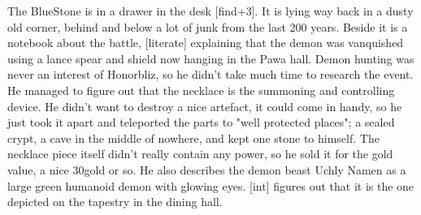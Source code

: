 \documentclass[11pt, twoside, titlepage, a4paper]{report}
\begin{document}
The BlueStone is in a drawer in the desk [find+3]. It is lying way back in a dusty old corner, behind and below a lot of junk from the last 200 years. Beside it is a notebook about the battle, [literate] explaining that the demon was vanquished using a lance spear and shield now hanging in the Pawa hall. Demon hunting was never an interest of Honorbliz, so he didn't take much time to research the event. He managed to figure out that the necklace is the summoning and controlling device. He didn't want to destroy a nice artefact, it could come in handy, so he just took it apart and teleported the parts to "well protected places"; a sealed crypt, a cave in the middle of nowhere, and kept one stone to himself. The necklace piece itself didn't really contain any power, so he sold it for the gold value, a nice 30gold or so. He also describes the demon beast Uchly Namen as a large green humanoid demon with glowing eyes. [int] figures out that it is the one depicted on the tapestry in the dining hall.
\end{document}
